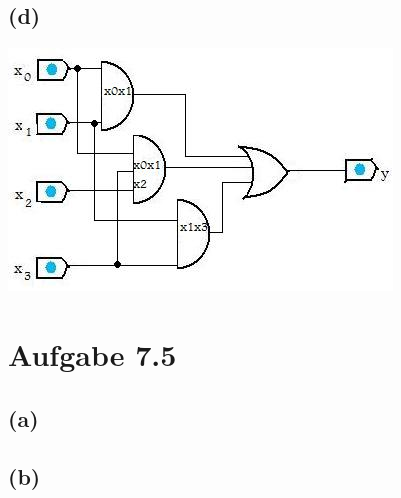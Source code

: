 \documentclass[12pt]{article}
\begin{document}
\subsection{(d)}
\includegraphics{Schaltplan}

\section{Aufgabe 7.5}

\subsection{(a)}
\subsection{(b)}
\end{document}
